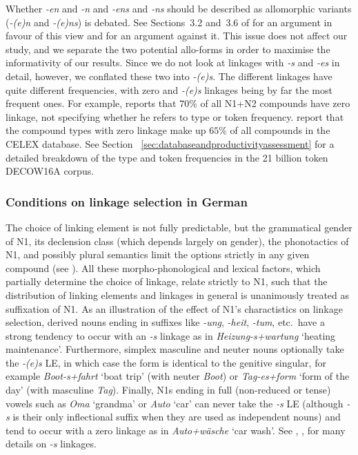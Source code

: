 Whether \textit{-en} and \textit{-n} and \textit{-ens} and \textit{-ns} should be described as allomorphic variants (\ie \textit{-(e)n} and \textit{-(e)ns}) is debated.
See Sections~3.2 and~3.6 of \textcite{NueblingSzczepaniak2013} for an argument in favour of this view and \textcite[33--36]{Neef2015} for an argument against it.
This issue does not affect our study, and we separate the two potential allo-forms in order to maximise the informativity of our results.
Since we do not look at linkages with \textit{-s} and \textit{-es} in detail, however, we conflated these two into \textit{-(e)s}.
The different linkages have quite different frequencies, with zero and \textit{-(e)s} linkages being by far the most frequent ones.
For example, \textcite[177]{Gallmann1998} reports that $70\%$ of all N1+N2 compounds have zero linkage, not specifying whether he refers to type or token frequency.
\textcite[29]{KrottEa2007} report that the compound types with zero linkage make up $65\%$ of all compounds in the CELEX database.
See Section~ \ref{sec:databaseandproductivityassessment} for a detailed breakdown of the type and token frequencies in the 21 billion token DECOW16A corpus.

\subsubsection{Conditions on linkage selection in German}

The choice of linking element is not fully predictable, but the grammatical gender of N1, its declension class (which depends largely on gender), the phonotactics of N1, and possibly plural semantics limit the options strictly in any given compound (see \citealt{Fuhrhop1996,NueblingSzczepaniak2013}).
All these morpho-phono\-logical and lexical factors, which partially determine the choice of linkage, relate strictly to N1, such that the distribution of linking elements and linkages in general is unanimously treated as suffixation of N1.
As an illustration of the effect of N1's charactistics on linkage selection, derived nouns ending in suffixes like \textit{-ung}, \textit{-heit}, \textit{-tum}, etc.\ have a strong tendency to occur with an \textit{-s} linkage as in \textit{Heizung-s+wartung} `heating maintenance'.
Furthermore, simplex masculine and neuter nouns optionally take the \textit{-(e)s} LE, in which case the form is identical to the genitive singular, for example \textit{Boot-s+fahrt} `boat trip' (with neuter \textit{Boot}) or \textit{Tag-es+form} `form of the day' (with masculine \textit{Tag}).
Finally, N1s ending in full (non-reduced or tense) vowels such as \textit{Oma} `grandma' or \textit{Auto} `car' can never take the \textit{-s} LE (although \textit{-s} is their only inflectional suffix when they are used as independent nouns) and tend to occur with a zero linkage as in \textit{Auto+wäsche} `car wash'.
See \textcite{Wegener2003}, \textcite{FuhrhopKuerschner2015}, \textcite{Fehringer2009} for many details on \textit{-s} linkages.

